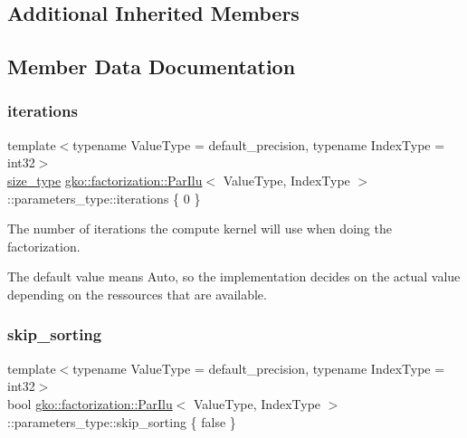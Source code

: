 \subsection*{Additional Inherited Members}


\subsection{Member Data Documentation}
\mbox{\label{structgko_1_1factorization_1_1ParIlu_1_1parameters__type_acf87db3479a61d53d301101b51e419c6}} 
\subsubsection{\texorpdfstring{iterations}{iterations}}
{\footnotesize\ttfamily template$<$typename Value\+Type  = default\+\_\+precision, typename Index\+Type  = int32$>$ \\
\hyperlink{namespacegko_a6e5c95df0ae4e47aab2f604a22d98ee7}{size\+\_\+type} \hyperlink{classgko_1_1factorization_1_1ParIlu}{gko\+::factorization\+::\+Par\+Ilu}$<$ Value\+Type, Index\+Type $>$\+::parameters\+\_\+type\+::iterations \{ 0 \}\hspace{0.3cm}{\ttfamily [mutable]}}



The number of iterations the {\ttfamily compute} kernel will use when doing the factorization. 

The default value {} means {\ttfamily Auto}, so the implementation decides on the actual value depending on the ressources that are available. \mbox{\label{structgko_1_1factorization_1_1ParIlu_1_1parameters__type_a89a795e164b7bbe60dbccf0484c1d411}} 
\subsubsection{\texorpdfstring{skip\+\_\+sorting}{skip\_sorting}}
{\footnotesize\ttfamily template$<$typename Value\+Type  = default\+\_\+precision, typename Index\+Type  = int32$>$ \\
bool \hyperlink{classgko_1_1factorization_1_1ParIlu}{gko\+::factorization\+::\+Par\+Ilu}$<$ Value\+Type, Index\+Type $>$\+::parameters\+\_\+type\+::skip\+\_\+sorting \{ false \}\hspace{0.3cm}{\ttfamily [mutable]}}



